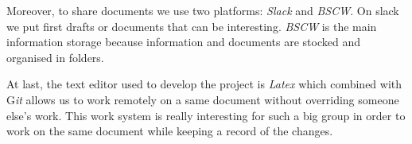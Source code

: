 Moreover, to share documents we use two platforms: \textit{Slack} and \textit{BSCW}. On slack we put first drafts or documents that can be interesting. \textit{BSCW} is the main information storage because information and documents are stocked and organised in folders. 
\newline

At last, the text editor used to develop the project is \textit{Latex} which combined with G\textit{it} allows us to work remotely on a same document without overriding someone else's work. This work system is really interesting for such a big group in order to work on the same document while keeping a record of the changes.